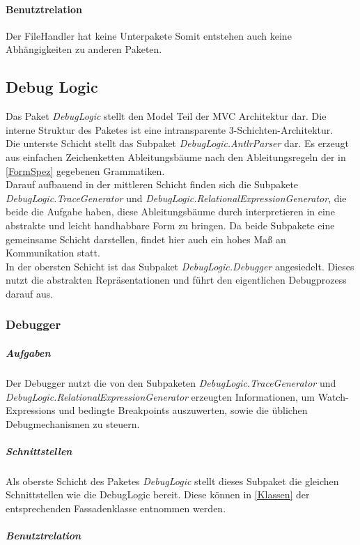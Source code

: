 \documentclass[parskip=full]{scrartcl}
\begin{document}
\paragraph{Benutztrelation}
Der FileHandler hat keine Unterpakete
Somit entstehen auch keine Abhängigkeiten zu anderen Paketen.

\subsection{Debug Logic}
Das Paket \textit{DebugLogic} stellt den Model Teil der MVC Architektur dar. Die interne Struktur des Paketes ist eine intransparente 3-Schichten-Architektur.\\
Die unterste Schicht stellt das Subpaket \textit{DebugLogic.AntlrParser} dar. Es erzeugt aus einfachen Zeichenketten Ableitungsbäume nach den Ableitungsregeln der in \ref{FormSpez} gegebenen Grammatiken.\\ Darauf aufbauend in der mittleren Schicht finden sich die Subpakete \textit{DebugLogic.TraceGenerator} und \textit{DebugLogic.RelationalExpressionGenerator}, die beide die Aufgabe haben, diese Ableitungsbäume durch interpretieren in eine abstrakte und leicht handhabbare Form zu bringen. Da beide Subpakete eine gemeinsame Schicht darstellen, findet hier auch ein hohes Maß an Kommunikation statt. \\ In der obersten Schicht ist das Subpaket \textit{DebugLogic.Debugger} angesiedelt. Dieses nutzt die abstrakten Repräsentationen und führt den eigentlichen Debugprozess darauf aus.
\subsubsection{Debugger}
\subparagraph{Aufgaben}
Der Debugger nutzt die von den Subpaketen \textit{DebugLogic.TraceGenerator} und \textit{DebugLogic.RelationalExpressionGenerator} erzeugten Informationen, um Watch-Expressions und bedingte Breakpoints auszuwerten, sowie die üblichen Debugmechanismen zu steuern.
\subparagraph{Schnittstellen}
Als oberste Schicht des Paketes \textit{DebugLogic} stellt dieses Subpaket die gleichen Schnittstellen wie die DebugLogic bereit. Diese können in \ref{Klassen} der entsprechenden Fassadenklasse entnommen werden.
\subparagraph{Benutztrelation} 
\end{document}
